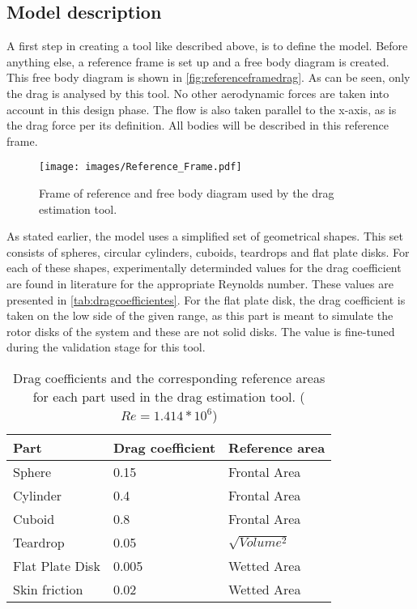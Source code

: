 \subsection{Model description}
A first step in creating a tool like described above, is to define the model. Before anything else, a reference frame is set up and a free body diagram is created. This free body diagram is shown in \autoref{fig:referenceframedrag}. As can be seen, only the drag is analysed by this tool. No other aerodynamic forces are taken into account in this design phase. The flow is also taken parallel to the x-axis, as is the drag force per its definition. All bodies will be described in this reference frame.

\begin{figure}[H]
	\centering
	\texttt{[image: images/Reference\_Frame.pdf]}
	\caption{Frame of reference and free body diagram used by the drag estimation tool.}
	\label{fig:referenceframedrag}
\end{figure}

\noindent As stated earlier, the model uses a simplified set of geometrical shapes. This set consists of spheres, circular cylinders, cuboids, teardrops and flat plate disks. For each of these shapes, experimentally determinded values for the drag coefficient are found in literature for the appropriate Reynolds number. These values are presented in \autoref{tab:dragcoefficientes}. For the flat plate disk, the drag coefficient is taken on the low side of the given range, as this part is meant to simulate the rotor disks of the system and these are not solid disks. The value is fine-tuned during the validation stage for this tool.

\begin{table}[H]
\caption{Drag coefficients and the corresponding reference areas for each part used in the drag estimation tool. ($Re = 1.414 * 10^6$)}
\label{tab:dragcoefficientes}
\begin{tabular}{|l|l|l|}
\hline
\textbf{Part}   & \textbf{Drag coefficient}             & \textbf{Reference area} \\ \hline
Sphere          & 0.15 \cite{SphereFlow}                & Frontal Area            \\ \hline
Cylinder        & 0.4 \cite{CylinderFlow}               & Frontal Area            \\ \hline
Cuboid          & 0.8 \cite{CuboidFlow}                 & Frontal Area            \\ \hline
Teardrop        & 0.05 \cite{ConeFlow1\cite{ConeFlow2} 	& $\sqrt{Volume^2}$       \\ \hline
Flat Plate Disk & 0.005 \cite{FlatPlateFlow}            & Wetted Area             \\ \hline
Skin friction	& 0.02 \cite{FlatPlateFlow}				& Wetted Area			  \\ \hline
\end{tabular}
\end{table}

